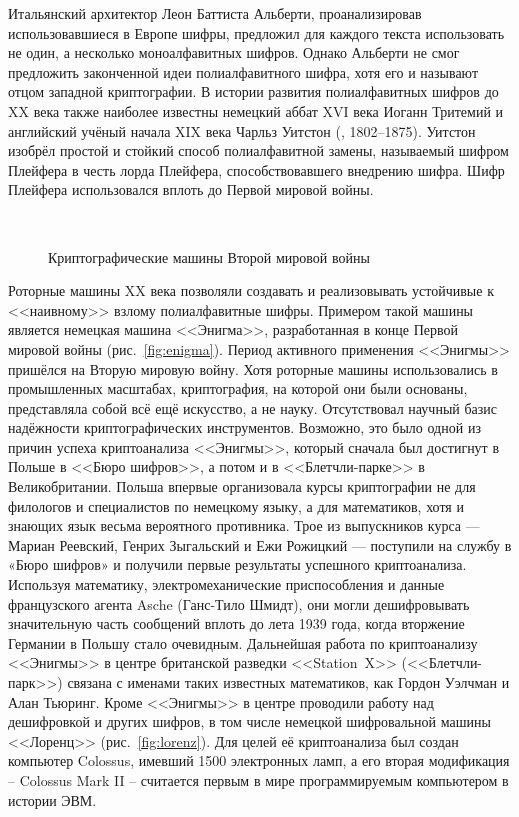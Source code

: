Итальянский архитектор Леон Баттиста Альберти, проанализировав использовавшиеся в Европе шифры, предложил для каждого текста использовать не один, а несколько моноалфавитных шифров. Однако Альберти не смог предложить законченной идеи полиалфавитного шифра, хотя его и называют отцом западной криптографии. В истории развития полиалфавитных шифров до XX века также наиболее известны немецкий аббат XVI века Иоганн Тритемий и английский учёный начала XIX века Чарльз Уитстон (, 1802--1875). Уитстон изобрёл простой и стойкий способ полиалфавитной замены, называемый шифром Плейфера в честь лорда Плейфера, способствовавшего внедрению шифра. Шифр Плейфера использовался вплоть до Первой мировой войны.

\begin{figure}[t]
	\centering
	~~
	\caption{Криптографические машины Второй мировой войны}
\end{figure}

Роторные машины XX века позволяли создавать и реализовывать устойчивые к <<наивному>> взлому полиалфавитные шифры. Примером такой машины является немецкая машина <<Энигма>>, разработанная в конце Первой мировой войны (рис.~\ref{fig:enigma}). Период активного применения <<Энигмы>> пришёлся на Вторую мировую войну. Хотя роторные машины использовались в промышленных масштабах, криптография, на которой они были основаны, представляла собой всё ещё искусство, а не науку. Отсутствовал научный базис надёжности криптографических инструментов. Возможно, это было одной из причин успеха криптоанализа <<Энигмы>>, который сначала был достигнут в Польше в <<Бюро шифров>>, а потом и в <<Блетчли-парке>> в Великобритании. Польша впервые организовала курсы криптографии не для филологов и специалистов по немецкому языку, а для математиков, хотя и знающих язык весьма вероятного противника. Трое из выпускников курса — Мариан Реевский, Генрих Зыгальский и Ежи Рожицкий — поступили на службу в «Бюро шифров» и получили первые результаты успешного криптоанализа. Используя математику, электромеханические приспособления и данные французского агента Asche (Ганс-Тило Шмидт), они могли дешифровывать значительную часть сообщений вплоть до лета 1939 года, когда вторжение Германии в Польшу стало очевидным. Дальнейшая работа по криптоанализу <<Энигмы>> в центре британской разведки <<Station~X>> (<<Блетчли-парк>>) связана с именами таких известных математиков, как Гордон Уэлчман и Алан Тьюринг. Кроме <<Энигмы>> в центре проводили работу над дешифровкой и других шифров, в том числе немецкой шифровальной машины <<Лоренц>> (рис.~\ref{fig:lorenz}). Для целей её криптоанализа был создан компьютер Colossus, имевший 1500 электронных ламп, а его вторая модификация -- Colossus Mark II -- считается первым в мире программируемым компьютером в истории ЭВМ.

